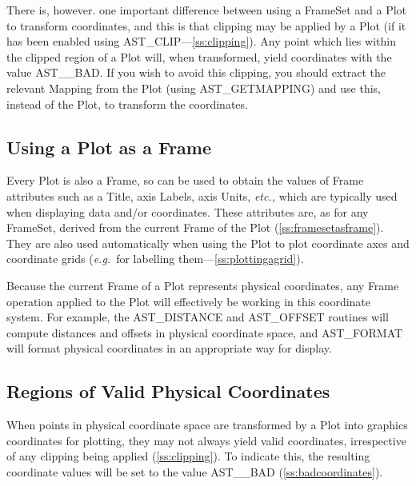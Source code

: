 \documentclass[twoside,11pt]{article}
\newcommand{\htmlref}[2]{#1}
\newcommand{\secref}[1]{\S\ref{#1}}
\renewcommand{\secref}[1]{\ref{#1}}
\begin{document}
There is, however. one important difference between using a \htmlref{FrameSet}{FrameSet}
and a Plot to transform coordinates, and this is that clipping may be
applied by a Plot (if it has been enabled using
\htmlref{AST\_CLIP}{AST_CLIP}---\secref{ss:clipping}). Any point which lies within the
clipped region of a Plot will, when transformed, yield coordinates
with the value AST\_\_BAD. If you wish to avoid this clipping, you
should extract the relevant \htmlref{Mapping}{Mapping} from the Plot (using
\htmlref{AST\_GETMAPPING}{AST_GETMAPPING}) and use this, instead of the Plot, to transform the
coordinates.

\subsection{Using a Plot as a Frame}

Every \htmlref{Plot}{Plot} is also a \htmlref{Frame}{Frame}, so can be used to obtain the values of
Frame attributes such as a \htmlref{Title}{Title}, axis Labels, axis Units,
{\em{etc.,}} which are typically used when displaying data and/or
coordinates. These attributes are, as for any \htmlref{FrameSet}{FrameSet}, derived from
the current Frame of the Plot (\secref{ss:framesetasframe}). They are
also used automatically when using the Plot to plot coordinate axes
and coordinate grids ({\em{e.g.}}\ for labelling
them---\secref{ss:plottingagrid}).

Because the current Frame of a Plot represents physical coordinates,
any Frame operation applied to the Plot will effectively be working in
this coordinate system. For example, the \htmlref{AST\_DISTANCE}{AST_DISTANCE} and \htmlref{AST\_OFFSET}{AST_OFFSET}
routines will compute distances and offsets in physical coordinate
space, and \htmlref{AST\_FORMAT}{AST_FORMAT} will format physical coordinates in an
appropriate way for display.

\subsection{\label{ss:validphysicalcoordinates}Regions of Valid Physical Coordinates}

When points in physical coordinate space are transformed by a \htmlref{Plot}{Plot}
into graphics coordinates for plotting, they may not always yield
valid coordinates, irrespective of any clipping being applied
(\secref{ss:clipping}). To indicate this, the resulting coordinate
values will be set to the value AST\_\_BAD
(\secref{ss:badcoordinates}).
\end{document}
